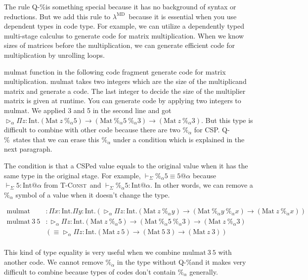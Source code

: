 \documentclass[runningheads]{llncs}
\newcommand{\LMD}{$\lambda^{\textrm{MD}}$\xspace}
\newcommand{\V}{\vdash_\Sigma}
\newcommand{\TW}{{\mathop{\triangleright}}}
\newcommand{\E}{\equiv}
\newcommand{\TConst}{\textsc{T-Const}}
\newcommand{\QPercent}{\textsc{Q-\%}}
\newcommand{\I}{\textrm{Int}}
\newcommand{\M}{\textrm{Mat}}
\begin{document}
  The rule \QPercent is something special because it has no background of syntax or reductions.
  But we add this rule to \LMD\ because it is essential when you use dependent types in code type.
  For example, we can utilize a dependently typed multi-stage calculus to generate code for matrix multiplication.
  When we know sizes of matrices before the multiplication,
  we can generate efficient code for multiplication by unrolling loops.


  $\text{mulmat}$ function in the following code fragment generate code for matrix multiplication.
  $\text{mulmat}$ takes two integers which are the size of the multiplicand matrix and generate a code.
  The last integer to decide the size of the multiplier matrix is given at runtime.
  You can generate code by applying two integers to $\text{mulmat}$.
  We applied 3 and 5 in the second line and got $\TW_\alpha \Pi z:\I.(\M\ z\ \%_\alpha 5) \to (\M\ \%_\alpha 5\ \%_\alpha 3) \to (\M\ z\ \%_\alpha 3)$.
  But this type is difficult to combine with other code because there are two $\%_\alpha$ for CSP.
  \QPercent\ states that we can erase this $\%_\alpha$ under a condition which is explained in the next paragraph.

  The condition is that a CSPed value equals to the original value when it has the same type in the original stage.
  For example, $\V \%_\alpha 5 \E 5 @ \alpha$ because $ \V 5 : \I @ \alpha $ from \TConst\ and  $ \V \%_\alpha 5 : \I @ \alpha$.
  In other words, we can remove a $\%_\alpha$ symbol of a value when it doesn't change the type.

  {
      \begin{align*}
          \text{mulmat}       & : \Pi x:\I.\Pi y:\I.(\TW_\alpha \Pi z:\I.(\M\ z\ \%_\alpha y) \to (\M\ \%_\alpha y\ \%_\alpha x) \to (\M\ z\ \%_\alpha x)) \\
          \text{mulmat}\ 3\ 5 & : \TW_\alpha \Pi z:\I.(\M\ z\ \%_\alpha 5) \to (\M\ \%_\alpha 5\ \%_\alpha 3) \to (\M\ z\ \%_\alpha 3)                     \\
                              & (\E \TW_\alpha \Pi z:\I.(\M\ z\ 5) \to (\M\ 5\ 3) \to (\M\ z\ 3) )                                                         \\
      \end{align*}
  }

  This kind of type equality is very useful when we combine $\text{mulmat}\ 3\ 5$ with another code.
  We cannot remove $\%_\alpha$ in the type without \QPercent and it makes very difficult to combine
  because types of codes don't contain $\%_\alpha$ generally.
\end{document}
